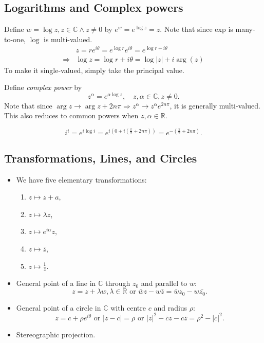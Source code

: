 \documentclass[a4paper]{article}
\begin{document}
\subsection{Logarithms and Complex powers}
\begin{definition}
  Define $ w = \log z, z\in \mathbb{C} \land z\neq 0 $ by $ e^w =
  e^{\log z}=z $. Note that since exp is many-to-one, $\log$ is multi-valued.
  \[
    \begin{aligned}
      & z = re^{i\theta} =e^{\log r}e^{i\theta}=e^{\log r+ i\theta}\\
      \Longrightarrow & \boxed{\log z = \log r+i\theta = \log |z|+i\arg(z)}
    \end{aligned}
  \]
  To make it single-valued, simply take the principal value.
\end{definition}
\begin{definition}
  Define \textit{complex power} by
  \[
    z^\alpha = e^{\alpha\log z}, \quad z,\alpha\in \mathbb{C} , z\neq 0
  .\]
  Note that since $ \arg z \to \arg z + 2n\pi \Rightarrow z^\alpha
  \to z^\alpha e^{2n\pi} $, it is generally multi-valued. This also
  reduces to common powers when $ z,\alpha\in \mathbb{R}. $
\end{definition}
\begin{example}
  \[
    i^i = e^{i\log i} = e^{i(0+i(\frac{\pi}{2}+2n\pi))} =
    e^{-(\frac{\pi}{2}+2n\pi)}
  .\]
\end{example}
\subsection{Transformations, Lines, and Circles}
\begin{itemize}
  \item We have five elementary transformations:
    \begin{enumerate}[(1)]
      \item $ z \mapsto z+a $,
      \item $ z \mapsto \lambda z $,
      \item $ z \mapsto e^{i\alpha} z $,
      \item $ z \mapsto \bar{z} $,
      \item $ z \mapsto \frac{1}{z} $.
    \end{enumerate}
  \item General point of a line in $\mathbb{C}$ through $z_0$ and
    parallel to $w$:
    \[
      z = z +\lambda w, \lambda\in \mathbb{R} \text{ or }
      \bar{w}z-w\bar{z}=\bar{w}z_0-w\bar{z_0}
    .\]
  \item General point of a circle in $\mathbb{C}$ with centre $ c $
    and radius $ \rho $:
    \[
      z = c+ \rho e^{i\theta} \text{ or } \left| z-c \right| = \rho
      \text{ or } |z|^2-\bar{c}z-c\bar{z}=\rho^2-|c|^2
    .\]
  \item Stereographic projection.
\end{itemize}
\end{document}
